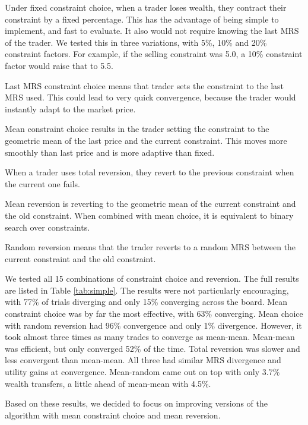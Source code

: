 \documentclass[12pt,a4paper,titlepage]{article}
\begin{document}
Under fixed constraint choice, when a trader loses wealth, they contract their constraint by a fixed percentage.
This has the advantage of being simple to implement, and fast to evaluate.
It also would not require knowing the last MRS of the trader.
We tested this in three variations, with 5\%, 10\% and 20\% constraint factors.
For example, if the selling constraint was 5.0, a 10\% constraint factor would raise that to 5.5.
    
Last MRS constraint choice means that trader sets the constraint to the last MRS used.
This could lead to very quick convergence, because the trader would instantly adapt to the market price.

Mean constraint choice results in the trader setting the constraint to the geometric mean of the last price and the current constraint.
This moves more smoothly than last price and is more adaptive than fixed.

When a trader uses total reversion, they revert to the previous constraint when the current one fails.

Mean reversion is reverting to the geometric mean of the current constraint and the old constraint.
When combined with mean choice, it is equivalent to binary search over constraints.

Random reversion means that the trader reverts to a random MRS between the current constraint and the old constraint.

We tested all 15 combinations of constraint choice and reversion.
The full results are listed in Table \ref{tab:simple}.
The results were not particularly encouraging, with 77\% of trials diverging and only 15\% converging across the board.
Mean constraint choice was by far the most effective, with 63\% converging.
Mean choice with random reversion had 96\% convergence and only 1\% divergence.
However, it took almost three times as many trades to converge as mean-mean.
Mean-mean was efficient, but only converged 52\% of the time.
Total reversion was slower and less convergent than mean-mean.
All three had similar MRS divergence and utility gains at convergence.
Mean-random came out on top with only 3.7\% wealth transfers, a little ahead of mean-mean with 4.5\%.

Based on these results, we decided to focus on improving versions of the algorithm with mean constraint choice and mean reversion.
\end{document}

